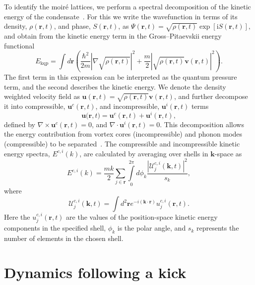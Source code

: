 To identify the moir\'e lattices, we perform a spectral decomposition of the kinetic energy of the condensate~\cite{CT:Nore_prl_1997,CT:Nore_pof_1997,CT:Bradley_prx_2012}. For this we write the wavefunction in terms of its density, $\rho(\mathbf{r},t)$, and
phase, $S(\mathbf{r},t)$, as
$
		\Psi(\mathbf{r},t) = \sqrt{\rho(\mathbf{r},t)}\exp{\left[\mathrm{i}S(\mathbf{r},t)\right]},
$
and obtain from the kinetic energy term in the Gross--Pitaevskii energy functional
	\begin{equation}
		E_\text{kqp} = \int d\mathbf{r} \left( \frac{\hbar^2}{2m}| \nabla\sqrt{\rho(\mathbf{r},t)} |^2  + \frac{m}{2}|\sqrt{\rho(\mathbf{r},t)}\mathbf{v}(\mathbf{r},t) |^2\right).
	\end{equation}
The first term in this expression can be interpreted as the quantum pressure term, and
the second describes the kinetic energy. We denote the density weighted velocity field as $\mathbf{u}(\mathbf{r},t) = \sqrt{\rho(\mathbf{r},t)}\mathbf{v}(\mathbf{r},t)$, and further decompose it into compressible, $\mathbf{u}^c(\mathbf{r},t)$, and incompressible, $\mathbf{u}^i(\mathbf{r},t)$ terms
	\begin{equation}
		\mathbf{u(r},t) = \mathbf{u}^c(\mathbf{r},t) + \mathbf{u}^i(\mathbf{r},t),
	\end{equation}
defined by $\nabla \times \mathbf{u}^c(\mathbf{r},t) = 0$, and $\nabla \cdot \mathbf{u}^i(\mathbf{r},t) = 0$. This decomposition allows the energy contribution from vortex cores (incompressible) and phonon modes (compressible) to be separated~\cite{CT:Horng_pra_2009}. The compressible and incompressible kinetic energy spectra, $E^{c,i}(k)$, are calculated by averaging over shells in $\mathbf{k}$-space as~\cite{CT:Bradley_prx_2012}
	\begin{equation}
		E^{c,i}(k) = \frac{mk}{2}\sum\limits_{j\in\mathbf{r}} \int\limits_{0}^{2\pi}d\phi_k \frac{ |\mathcal{U}_j^{c,i}(\mathbf{k},t) |^2}{s_k},
	\end{equation}
	where
	\begin{equation}
		\mathcal{U}_j^{c,i}(\mathbf{k},t) = \int d^2 \mathbf{r} e^{-i(\mathbf{k}\cdot\mathbf{r})} u_j^{c,i}(\mathbf{r},t).
	\end{equation}
	Here the $u_j^{c,i}(\mathbf{r},t)$ are the values of the position-space kinetic energy components in the specified shell, $\phi_k$ is the polar angle, and $s_k$ represents the number of elements in the chosen shell.

    \section{Dynamics following a kick}\label{sec:kickvl}
